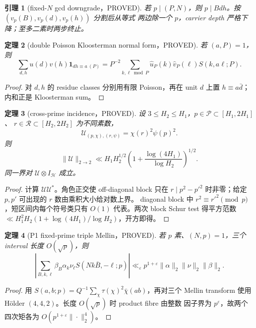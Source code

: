 \documentclass[11pt,a4paper]{ctexart}
\newtheorem{theorem}{定理}[section]
\newtheorem{lemma}[theorem]{引理}
\theoremstyle{definition}
\newcommand{\1}{\mathbf 1}
\newcommand{\PROVED}{\textcolor{green!40!black}{\textsf{PROVED}}}
\begin{document}
\begin{lemma}[fixed-$N$ gcd downgrade，\PROVED]
若 $p\mid(P,N)$，则 $p\mid Bdh$。按 $(v_p(B),v_p(d),v_p(h))$ 分割后从等式
两边除一个 $p$，carrier depth 严格下降；至多二素时两步终止。
\end{lemma}

\begin{theorem}[double Poisson Kloosterman normal form，\PROVED]
若 $(a,P)=1$，则
\[
 \sum_{d,h}u(d)v(h)\1_{dh\equiv a\ (P)}
 =P^{-2}\sum_{k,\ell\bmod P}\widehat u_P(k)\widehat v_P(\ell)
 S(k,a\ell;P).                                       \tag{G3.4}
\]
\end{theorem}
\begin{proof}
对 $d,h$ 的 residue classes 分别用有限 Poisson，再在 unit $d$ 上置
$h\equiv a\bar d$；内和正是 Kloosterman sum。
\end{proof}

\begin{theorem}[cross-prime incidence，\PROVED]
设 $3\le H_2\le H_1$，$p\in\mathcal P\subset[H_1,2H_1]$、
$r\in\mathcal R\subset[H_2,2H_2]$ 为不同素数，
\[
 \mathscr U_{(p,\chi),(r,\psi)}=\chi(r)^2\psi(p)^2.
\]
则
\[
 \|\mathscr U\|_{2\to2}\ll H_1H_2^{1/2}
 \left(1+\frac{\log(4H_1)}{\log H_2}\right)^{1/2}. \tag{G3.5}
\]
同一界对 $\mathscr U\otimes I_{\mathcal H}$ 成立。
\end{theorem}
\begin{proof}
计算 $\mathscr U\mathscr U^*$。角色正交使 off-diagonal block 只在
$r\mid p^2-p'^2$ 时非零；给定 $p,p'$ 可出现的 $r$ 数由乘积大小给对数上界。
diagonal block 中 $r^2\equiv r'^2\pmod p$，短区间内每个符号类只有 $O(1)$
代表。两次 block Schur test 得平方范数
$\ll H_1^2H_2(1+\log(4H_1)/\log H_2)$，开方即得。
\end{proof}

\begin{theorem}[P1 fixed-prime triple Mellin，\PROVED]
若 $p$ 素、$(N,p)=1$，三个 interval 长度 $O(\sqrt p)$，则
\[
 \left|\sum_{B,k,\ell}\beta_B\alpha_k\nu_\ell
 S(Nk\bar B,-\ell;p)\right|
 \ll_{\varepsilon}p^{1+\varepsilon}
 \|\alpha\|_2\|\nu\|_2\|\beta\|_2.               \tag{G3.6}
\]
\end{theorem}
\begin{proof}
用
$S(a,b;p)=Q^{-1}\sum_\chi\tau(\chi)^2\bar\chi(ab)$，再对三个 Mellin
transform 使用 H\"older $(4,4,2)$。长度 $O(\sqrt p)$ 时 product fibre 由整数
因子界为 $p^\varepsilon$，故两个四次矩各为 $O(p^{1+\varepsilon}\|\cdot\|_2^4)$。
\end{proof}
\end{document}
